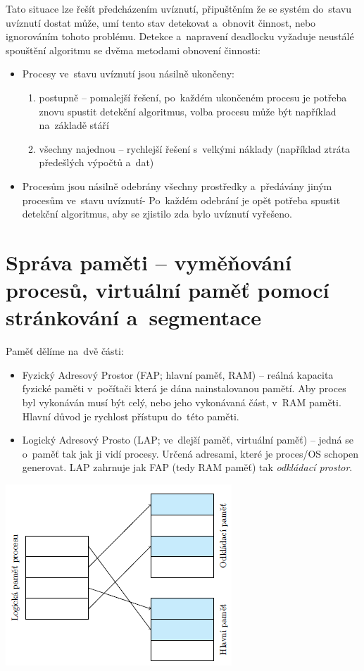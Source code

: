 Tato situace lze řešít předcházením uvíznutí, připuštěním že se systém do~stavu uvíznutí dostat může, umí tento stav detekovat a~obnovit činnost, nebo ignorováním tohoto problému. Detekce a~napravení deadlocku vyžaduje neustálé spouštění algoritmu se dvěma metodami obnovení činnosti:

\begin{itemize}[noitemsep]
	\item Procesy ve~stavu uvíznutí jsou násilně ukončeny: 
	\begin{enumerate}
		\item postupně -- pomalejší řešení, po~každém ukončeném procesu je potřeba znovu spustit detekční algoritmus, volba procesu může být například na~základě stáří
		\item všechny najednou -- rychlejší řešení s~velkými náklady (například ztráta předešlých výpočtů a~dat)
	\end{enumerate}
	
	\item Procesům jsou násilně odebrány všechny prostředky a~předávány jiným procesům ve~stavu uvíznutí- Po~každém odebrání je opět potřeba spustit detekční algoritmus, aby se zjistilo zda bylo uvíznutí vyřešeno.
\end{itemize}


\clearpage
\section{Správa paměti -- vyměňování procesů, virtuální paměť pomocí stránkování a~segmentace}

Paměť dělíme na~dvě části:
\begin{itemize}
	\item Fyzický Adresový Prostor (FAP; hlavní paměť, RAM) -- reálná kapacita fyzické paměti v~počítači která je dána nainstalovanou pamětí. Aby proces byl vykonáván musí být celý, nebo jeho vykonávaná část, v~RAM paměti. Hlavní důvod je rychlost přístupu do~této paměti. 
	\item Logický Adresový Prosto (LAP; ve~dlejší paměť, virtuální paměť) -- jedná se o~paměť tak jak ji vidí procesy. Určená adresami, které je proces/OS schopen generovat. LAP zahrnuje jak FAP (tedy RAM paměť) tak \emph{odkládací prostor}.
\end{itemize}

\begin{center}
	\includegraphics[scale=1]{images/mem_lap.png}
\label{mem:lap}
\end{center}

